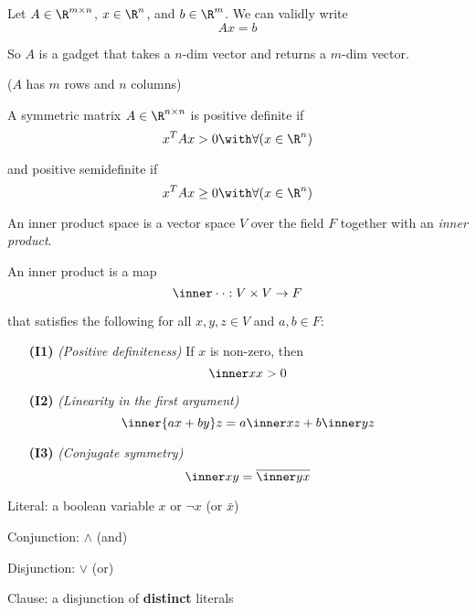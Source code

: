 
\label{d8bd136}

Let $A\in\R^{m\times n}$, $x\in\R^n$, and $b\in\R^m$. We can validly write
$$
  Ax = b
$$

So $A$ is a gadget that takes a $n$-dim vector and returns a $m$-dim vector.

($A$ has $m$ rows and $n$ columns)

\label{e25e722}

A symmetric matrix $A\in\R^{n\times n}$ is positive definite if
$$
  x^TAx>0\with\forall(x\in\R^n)
$$

and positive semidefinite if
$$
  x^TAx\geq0\with\forall(x\in\R^n)
$$

\label{cebd07a}

An inner product space is a vector space $V$ over the field $F$ together with
an \textit{inner product}.

An inner product is a map
$$
  \inner\cdot\cdot:V\times V\to F
$$

that satisfies the following for all $x,y,z\in V$ and $a,b\in F$:
\begin{enumerate}
  \item[\textbf{(I1)}] \textit{(Positive definiteness)} If $x$ is
        non-zero, then
        $$
          \inner xx>0
        $$
  \item[\textbf{(I2)}] \textit{(Linearity in the first argument)}
        $$
          \inner{ax+by}z = a\inner xz + b\inner yz
        $$
  \item[\textbf{(I3)}] \textit{(Conjugate symmetry)}
        $$
          \inner xy=\overline{\inner yx}
        $$
\end{enumerate}


\label{ba4e2fa}

\begin{enumerata}
  \item Literal: a boolean variable $x$ or $\neg x$ (or $\bar x$)
  \item Conjunction: $\land$ (and)
  \item Disjunction: $\lor$ (or)
  \item Clause: a disjunction of \textbf{distinct} literals
\end{enumerata}


